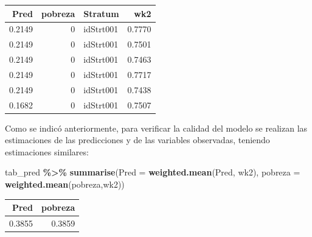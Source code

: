 \documentclass[
  12pt,
]{book}
\newenvironment{Shaded}{\begin{snugshade}}{\end{snugshade}}
\newcommand{\AttributeTok}[1]{\textcolor[rgb]{0.13,0.29,0.53}{#1}}
\newcommand{\DataTypeTok}[1]{\textcolor[rgb]{0.13,0.29,0.53}{#1}}
\newcommand{\DecValTok}[1]{\textcolor[rgb]{0.00,0.00,0.81}{#1}}
\newcommand{\FunctionTok}[1]{\textcolor[rgb]{0.13,0.29,0.53}{\textbf{#1}}}
\newcommand{\NormalTok}[1]{#1}
\newcommand{\OtherTok}[1]{\textcolor[rgb]{0.56,0.35,0.01}{#1}}
\newcommand{\SpecialCharTok}[1]{\textcolor[rgb]{0.81,0.36,0.00}{\textbf{#1}}}
\newcommand{\StringTok}[1]{\textcolor[rgb]{0.31,0.60,0.02}{#1}}
\begin{document}
\begin{Shaded}
\end{Shaded}

\begin{tabular}{r|r|l|r}
\hline
Pred & pobreza & Stratum & wk2\\
\hline
0.2149 & 0 & idStrt001 & 0.7770\\
\hline
0.2149 & 0 & idStrt001 & 0.7501\\
\hline
0.2149 & 0 & idStrt001 & 0.7463\\
\hline
0.2149 & 0 & idStrt001 & 0.7717\\
\hline
0.2149 & 0 & idStrt001 & 0.7438\\
\hline
0.1682 & 0 & idStrt001 & 0.7507\\
\hline
\end{tabular}

Como se indicó anteriormente, para verificar la calidad del modelo se realizan las estimaciones de las predicciones y de las variables observadas, teniendo estimaciones similares:

\begin{Shaded}
\begin{Highlighting}[]
\NormalTok{tab\_pred }\SpecialCharTok{\%\textgreater{}\%} 
  \FunctionTok{summarise}\NormalTok{(}\AttributeTok{Pred =} \FunctionTok{weighted.mean}\NormalTok{(Pred, wk2), }
            \AttributeTok{pobreza =} \FunctionTok{weighted.mean}\NormalTok{(pobreza,wk2))}
\end{Highlighting}
\end{Shaded}

\begin{tabular}{r|r}
\hline
Pred & pobreza\\
\hline
0.3855 & 0.3859\\
\hline
\end{tabular}
\end{document}
